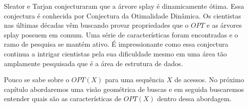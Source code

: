 Sleator e Tarjan \cite{selfadjustingbst} conjecturaram que a árvore splay é dinamicamente ótima. Essa conjectura é conhecida por Conjectura da Otimalidade Dinâmica. Os cientistas nas últimas décadas vêm buscando provar propriedades que o $OPT$ e as árvores splay possuem em comum. Uma série de características foram encontradas e o ramo de pesquisa se mantém ativo. É impressionante como essa conjectura continua a intrigar cientistas pela sua dificuldade mesmo em uma área tão amplamente pesquisada que é a área de estrutura de dados.

Pouco se sabe sobre o $OPT(X)$ para uma sequência $X$ de acessos. No próximo capítulo abordaremos uma visão geométrica de buscas e em seguida buscaremos entender quais são as características de $OPT(X)$ dentro dessa abordagem. 